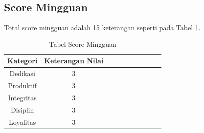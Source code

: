 \subsection{Score Mingguan}
Total score mingguan adalah 15 keterangan seperti pada Tabel \ref{table:scoremingguan}.
\begin{table}[!ht]
\centering
\begin{tabular}{ |c|c|c|c|c|c|c|c|c|c| }
\hline
Kategori & Keterangan Nilai \\
\hline
Dedikasi & 3 \\
\hline
Produktif & 3 \\
\hline
Integritas & 3 \\
\hline
Disiplin & 3 \\
\hline
Loyalitas & 3 \\
\hline
\end{tabular}
\caption{Tabel Score Mingguan}
\label{table:scoremingguan}
\end{table}
